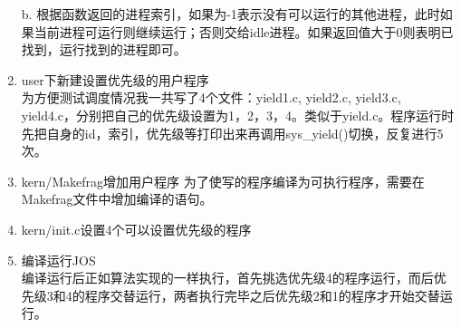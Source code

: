 \documentclass[11pt,a4paper]{article}
\begin{document}
\begin{enumerate}
b. 根据函数返回的进程索引，如果为-1表示没有可以运行的其他进程，此时如果当前进程可运行则继续运行；否则交给idle进程。如果返回值大于0则表明已找到，运行找到的进程即可。\\
\item user下新建设置优先级的用户程序\\
为方便测试调度情况我一共写了4个文件：yield1.c, yield2.c, yield3.c, yield4.c，分别把自己的优先级设置为1，2，3，4。类似于yield.c。程序运行时先把自身的id，索引，优先级等打印出来再调用sys\_yield()切换，反复进行5次。\\
\item kern/Makefrag增加用户程序
为了使写的程序编译为可执行程序，需要在Makefrag文件中增加编译的语句。
\item kern/init.c设置4个可以设置优先级的程序
\item 编译运行JOS\\
编译运行后正如算法实现的一样执行，首先挑选优先级4的程序运行，而后优先级3和4的程序交替运行，两者执行完毕之后优先级2和1的程序才开始交替运行。\\
\end{enumerate}
\end{document}
